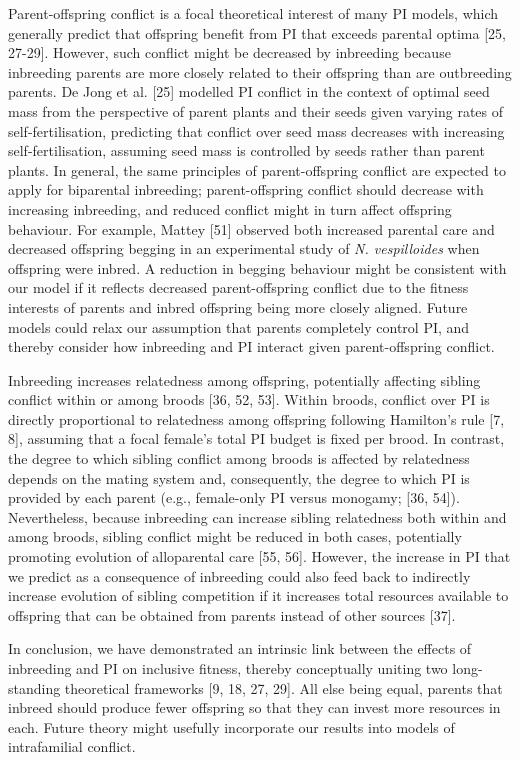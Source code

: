 \documentclass[12pt]{article}
\begin{document}
Parent-offspring conflict is a focal theoretical interest of many PI models, which generally predict that offspring benefit from PI that exceeds parental optima [25, 27-29]. However, such conflict might be decreased by inbreeding because inbreeding parents are more closely related to their offspring than are outbreeding parents. De Jong et al. [25] modelled PI conflict in the context of optimal seed mass from the perspective of parent plants and their seeds given varying rates of self-fertilisation, predicting that conflict over seed mass decreases with increasing self-fertilisation, assuming seed mass is controlled by seeds rather than parent plants. In general, the same principles of parent-offspring conflict are expected to apply for biparental inbreeding; parent-offspring conflict should decrease with increasing inbreeding, and reduced conflict might in turn affect offspring behaviour. For example, Mattey [51] observed both increased parental care and decreased offspring begging in an experimental study of \textit{N. vespilloides} when offspring were inbred. A reduction in begging behaviour might be consistent with our model if it reflects decreased parent-offspring conflict due to the fitness interests of parents and inbred offspring being more closely aligned. Future models could relax our assumption that parents completely control PI, and thereby consider how inbreeding and PI interact given parent-offspring conflict.

Inbreeding increases relatedness among offspring, potentially affecting sibling conflict within or among broods [36, 52, 53]. Within broods, conflict over PI is directly proportional to relatedness among offspring following Hamilton's rule [7, 8], assuming that a focal female's total PI budget is fixed per brood. In contrast, the degree to which sibling conflict among broods is affected by relatedness depends on the mating system and, consequently, the degree to which PI is provided by each parent (e.g., female-only PI versus monogamy; [36, 54]). Nevertheless, because inbreeding can increase sibling relatedness both within and among broods, sibling conflict might be reduced in both cases, potentially promoting evolution of alloparental care [55, 56]. However, the increase in PI that we predict as a consequence of inbreeding could also feed back to indirectly increase evolution of sibling competition if it increases total resources available to offspring that can be obtained from parents instead of other sources [37].

In conclusion, we have demonstrated an intrinsic link between the effects of inbreeding and PI on inclusive fitness, thereby conceptually uniting two long-standing theoretical frameworks [9, 18, 27, 29]. All else being equal, parents that inbreed should produce fewer offspring so that they can invest more resources in each. Future theory might usefully incorporate our results into models of intrafamilial conflict.
\end{document}

